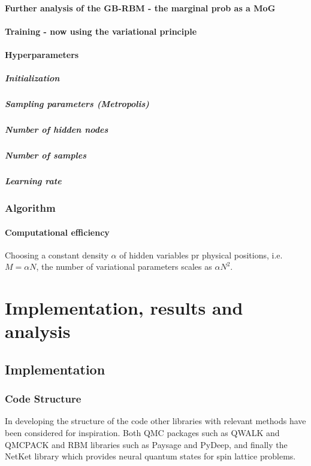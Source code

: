 \documentclass[twoside,english]{uiofysmaster}
\begin{document}
\subsection{Further analysis of the GB-RBM - the marginal prob as a MoG}
\subsection{Training - now using the variational principle}
\subsection{Hyperparameters}
\subsubsection{Initialization}
\subsubsection{Sampling parameters (Metropolis)}
\subsubsection{Number of hidden nodes}
\subsubsection{Number of samples}
\subsubsection{Learning rate}
\section{Algorithm}
\subsection{Computational efficiency}
Choosing a constant density $\alpha$ of hidden variables pr physical positions, i.e. $M=\alpha N$, the number of variational parameters scales as $\alpha N^2$.

\part{Implementation, results and analysis}
\chapter{Implementation}
\section{Code Structure}
In developing the structure of the code other libraries with relevant methods have been considered for inspiration. Both QMC packages such as QWALK and QMCPACK and RBM libraries such as Paysage and PyDeep, and finally the NetKet library which provides neural quantum states for spin lattice problems. 
\end{document}
